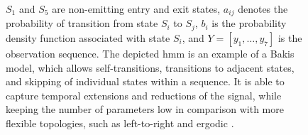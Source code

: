 \begin{figure}[!ht, margin=1cm]
  \begin{adjustwidth}{2cm}{2cm}
  \justify
  \small
  $S_{1}$ and $S_{5}$ are non-emitting entry and exit states, $a_{ij}$ denotes the probability of transition from state $S_{i}$ to $S_{j}$, $b_{i}$ is the probability density function associated with state $S_{i}$, and $Y=[y_{1}, \ldots, y_{7}]$ is the observation sequence. The depicted \gls{hmm} is an example of a Bakis model, which allows self-transitions, transitions to adjacent states, and skipping of individual states within a sequence. It is able to capture temporal extensions and reductions of the signal, while keeping the number of parameters low in comparison with more flexible topologies, such as left-to-right and ergodic \cite{fink2008markov}.
\end{adjustwidth}
  \end{figure}
